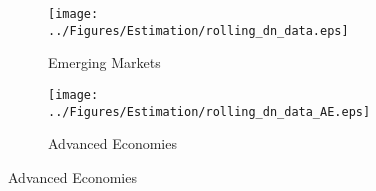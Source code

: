 \documentclass{article}
\begin{document}
	\begin{figure}[tbph]
		\caption{Comovement of Yield Curves: Rolling Correlations} \label{fig:rolling_ts}
		\begin{center}
			\begin{minipage}{0.9\linewidth}
				\begin{center}
					\begin{subfigure}[t]{\linewidth}
						\texttt{[image: ../Figures/Estimation/rolling\_dn\_data.eps]} \\
						\vspace{-0.37cm}
						\caption{Emerging Markets} \label{subfig:rolling_tsEM}
						\vspace{0.4cm}
					\end{subfigure}
					
					\begin{subfigure}[t]{\linewidth}
						\texttt{[image: ../Figures/Estimation/rolling\_dn\_data\_AE.eps]} \\
						\vspace{-0.37cm}
						\caption{Advanced Economies} \label{subfig:rolling_tsAE}
						\vspace{0.4cm}
					\end{subfigure}
					
				\end{center}
				\vspace{-0.45cm}
			\end{minipage}
		\end{center}
	\end{figure}
\end{document}
